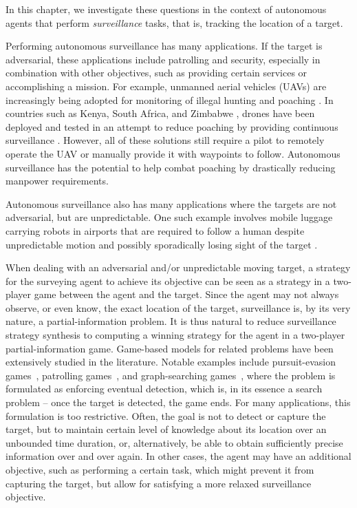 
In this chapter, we investigate these questions in the context of autonomous agents that perform \emph{surveillance} tasks, that is, tracking the location of a target. 


Performing autonomous surveillance has many applications. If the target is adversarial, these applications include patrolling and security, especially in combination with other objectives, such as providing certain services or accomplishing a mission. For example, unmanned aerial vehicles (UAVs) are increasingly being adopted for monitoring of illegal hunting and poaching \cite{poaching}. In countries such as Kenya, South Africa, and Zimbabwe \cite{drones}, drones have been deployed and tested in an attempt to reduce poaching by providing continuous surveillance \cite{poaching}. However, all of these solutions still require a pilot to remotely operate the UAV or manually provide it with waypoints to follow. Autonomous surveillance has the potential to help combat poaching by drastically reducing manpower requirements. 

Autonomous surveillance also has many applications where the targets are not adversarial, but are unpredictable. One such example involves mobile luggage carrying robots in airports that are required to follow a human despite unpredictable motion and possibly sporadically losing sight of the target \cite{GonBanos02}. 

When dealing with an adversarial and/or unpredictable moving target, a strategy for the surveying agent to achieve its objective can be seen as a strategy in a two-player game between the agent and the target. Since the agent may not always observe, or even know, the exact location of the target, surveillance is, by its very nature, a partial-information problem.
It is thus natural to reduce surveillance strategy synthesis to computing a winning strategy for the agent in a two-player partial-information game. Game-based models for related problems have been extensively studied in the literature. Notable examples include pursuit-evasion games~\cite{Chung2011}, patrolling games~\cite{Basilico12}, and graph-searching games~\cite{Kreutzer11}, where the problem is formulated as enforcing eventual detection, which is, in its essence a search problem -- once the target is detected, the game ends. For many applications, this formulation is too restrictive. Often, the goal is not to detect or capture the target, but to maintain certain level of knowledge about its location over an unbounded time duration, or, alternatively, be able to obtain sufficiently precise information over and over again. In other cases, the agent may have an additional objective, such as performing a certain task, which might prevent it from capturing the target, but allow for satisfying a more relaxed surveillance objective.

